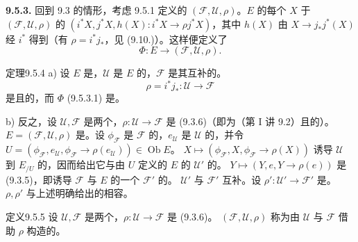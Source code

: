 \textbf{9.5.3.} 回到 9.3 的情形，考虑 9.5.1 定义的 $(\mathscr F,\mathscr U,\rho)$。$E$ 的每个 $X$ 于 $(\mathscr F,\mathscr U,\rho)$ 的 $(i^*X,j^*X,h(X):i^*X\to\rho j^*X)$，其中 $h(X)$ 由 $X\to j_*j^*(X)$ 经 $i^*$ 得到（有 $\rho=i^*j_*$，见 (9.10.)）。这样便定义了
\[
\Phi:E\longrightarrow(\mathscr F,\mathscr U,\rho).\tag{9.5.3.1}
\]
\begin{SGAresult}{定理}{9.5.4}
a) 设 $E$ 是，$\mathscr U$ 是 $E$ 的，$\mathscr F$ 是其互补的。
\[
\rho=i^*j_*:\mathscr U\longrightarrow\mathscr F
\]
是且的，而 $\Phi$ (9.5.3.1) 是。

b) 反之，设 $\mathscr U,\mathscr F$ 是两个，$\rho:\mathscr U\to\mathscr F$ 是 (9.3.6)（即为（第 I 讲 9.2）且的）。 $E=(\mathscr F,\mathscr U,\rho)$ 是。设 $\phi_{\mathscr F}$ 是 $\mathscr F$ 的，$e_{\mathscr U}$ 是 $\mathscr U$ 的，并令 $U=(\phi_{\mathscr F},e_{\mathscr U},\phi_{\mathscr F}\to\rho(e_{\mathscr U}))\in\operatorname{Ob}E$。 $X\mapsto(\phi_{\mathscr F},X,\phi_{\mathscr F}\to\rho(X))$ 诱导 $\mathscr U$ 到 $E_{/U}$ 的，因而给出它与由 $U$ 定义的 $E$ 的 $\mathscr U'$ 的。 $Y\mapsto(Y,e,Y\to\rho(e))$ 是 (9.3.5)，即诱导 $\mathscr F$ 与 $E$ 的一个 $\mathscr F'$ 的。
 $\mathscr U'$ 与 $\mathscr F'$ 互补。设 $\rho':\mathscr U'\to\mathscr F'$ 是。 $\rho,\rho'$ 与上述明确给出的相容。
\end{SGAresult}
\begin{SGAresult}{定义}{9.5.5}
设 $\mathscr U,\mathscr F$ 是两个，$\rho:\mathscr U\to\mathscr F$ 是 (9.3.6)。 $(\mathscr F,\mathscr U,\rho)$ 称为由 $\mathscr U$ 与 $\mathscr F$ 借助 $\rho$ 构造的。
\end{SGAresult}
